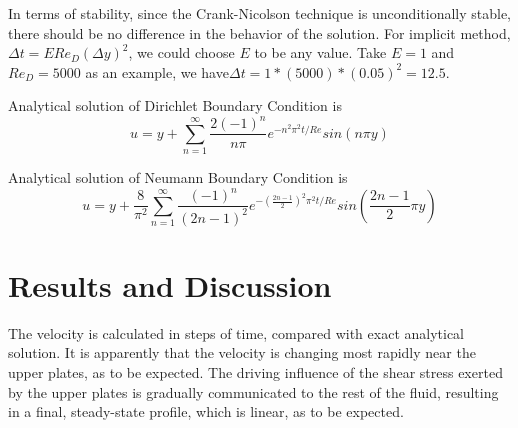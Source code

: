 In terms of stability, since the Crank-Nicolson technique is unconditionally stable, there should be no difference in the behavior of the solution. For implicit method, $\Delta t = E Re_D (\Delta y)^2$, we could choose $E$ to be any value. Take $E=1$ and $Re_D=5000$ as an example, we have$\Delta t = 1*(5000)*(0.05)^2=12.5$.

Analytical solution of Dirichlet Boundary Condition is
\begin{equation}
u=y+\sum_{n=1}^\infty\frac{2(-1)^n}{n\pi} e^{-n^2 \pi^2 t/Re} sin(n \pi y)
\end{equation}

Analytical solution of Neumann Boundary Condition is
\begin{equation}
u=y+\frac{8}{\pi ^2}\sum_{n=1}^\infty\frac{(-1)^n}{(2n-1)^2} e^{-(\frac{2n-1}{2})^2 \pi^2 t/Re} sin(\frac{2n-1}{2} \pi y)
\end{equation}

\section{Results and Discussion}
The velocity is calculated in steps of time, compared with exact analytical solution. It is apparently that the velocity is changing most rapidly near the upper plates, as to be expected. The driving influence of the shear stress exerted by the upper plates is gradually communicated to the rest of the fluid, resulting in a final, steady-state profile, which is linear, as to be expected.
\begin{figure}[htbp]
\centering
{}%
%
\end{figure}

\begin{figure}[htbp]
\centering
{}%
%
\end{figure}

